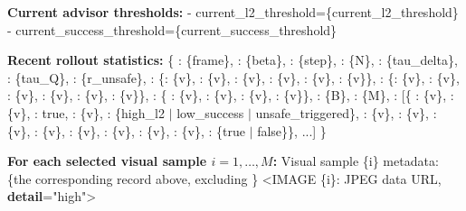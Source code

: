 \begin{algorithm}[H]
{\begin{minipage}[t]{0.485\linewidth}
\begin{algorithmic}
\STATE \textbf{Current advisor thresholds:}
\STATE - current\_l2\_threshold=\{current\_l2\_threshold\}
\STATE - current\_success\_threshold=\{current\_success\_threshold\}
\end{algorithmic}
\end{minipage}\hfill
\begin{minipage}[t]{0.485\linewidth}
\begin{algorithmic}
\setlength{\itemsep}{0pt}
\STATE \textbf{Recent rollout statistics:}
\STATE \{
\STATE \hspace{0.5em}: \{frame\},
: \{beta\}, : \{step\},
\STATE \hspace{0.5em}: \{N\},
: \{tau\_delta\},
\STATE \hspace{0.5em}: \{tau\_Q\},
: \{r\_unsafe\},
\STATE \hspace{0.5em}: \{: \{v\}, : \{v\},
: \{v\},
\STATE \hspace{3em}: \{v\}, : \{v\},
: \{v\}\},
\STATE \hspace{0.5em}: \{: \{v\},
: \{v\}, : \{v\},
\STATE \hspace{3em}: \{v\}, : \{v\},
: \{v\}\},
\STATE \hspace{0.5em}: \{
: \{v\},
\STATE \hspace{3em}: \{v\},
: \{v\},
\STATE \hspace{3em}: \{v\}\},
\STATE \hspace{0.5em}: \{B\},
: \{M\},
\STATE \hspace{0.5em}: [\{
: \{v\}, : \{v\},
\STATE \hspace{3em}: true,
: \{v\}, : \{high\_l2 $\mid$
low\_success $\mid$ unsafe\_triggered\},
\STATE \hspace{3em}: \{v\},
: \{v\},
\STATE \hspace{3em}: \{v\},
: \{v\},
\STATE \hspace{3em}: \{v\},
: \{v\}, : \{v\},
\STATE \hspace{3em}: \{v\},
: \{true $\mid$ false\}\}, ...]
\STATE \}

\STATE \textbf{For each selected visual sample $i=1,\ldots,M$:}
\STATE Visual sample \{i\} metadata: \{the corresponding record above,
excluding \}
\STATE \textless IMAGE \{i\}: JPEG data URL, \textbf{detail}="high"\textgreater
\end{algorithmic}
\end{minipage}
}
\end{algorithm}

